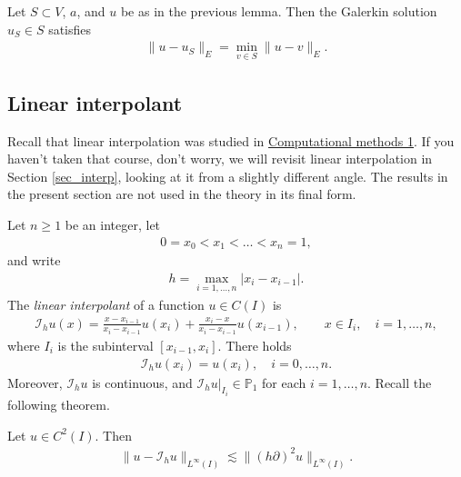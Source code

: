 \documentclass[12pt,oneside]{amsart}
\def\I{\mathcal I}
\begin{document}
\begin{corollary}\label{cor_abs_err}
Let $S \subset V$, $a$, and $u$ be as in the previous lemma. 
Then the Galerkin solution $u_S \in S$ satisfies
    \begin{align*}
\|u-u_S\|_E = \min_{v \in S} \|u - v\|_E.
    \end{align*}
\end{corollary}

\subsection{Linear interpolant}

Recall that linear interpolation was studied in \href{https://github.com/uh-comp-methods1/notebooks/blob/main/interpolation/lecture.ipynb}{Computational methods 1}. If you haven't taken that course, don't worry, we will revisit linear interpolation in Section \ref{sec_interp}, looking at it from a slightly different angle. The results in the present section are not used in the theory in its final form. 

Let $n \ge 1$ be an integer, let 
    \begin{align}\label{def_mesh}
0 = x_0 < x_1 < \dots < x_n = 1,
    \end{align}
and write
    \begin{align}\label{def_mesh_size}
h = \max_{i=1,\dots,n} |x_i - x_{i-1}|.
    \end{align}
The {\em linear interpolant} of a function $u \in C(I)$ is 
    \begin{align*}
\I_h u(x) = \frac{x - x_{i-1}}{x_i - x_{i-1}} u(x_i) + \frac{x_{i} - x}{x_i - x_{i-1}} u(x_{i-1}), \qquad x \in I_i, \quad i = 1,\dots,n,
    \end{align*}
where $I_i$ is the subinterval $[x_{i-1}, x_i]$.
There holds 
    \begin{align*}
\I_h u(x_i) = u(x_i), \quad i=0,\dots,n.
    \end{align*}
Moreover, $\I_h u$ is continuous, and $\I_h u|_{I_i} \in \mathbb P_1$ for each $i=1,\dots,n$. 
Recall the following theorem.

\begin{theorem}
Let $u \in C^2(I)$. Then 
    \begin{align*}
\|u - \I_h u\|_{L^\infty(I)} \lesssim \|(h \partial)^2 u\|_{L^\infty(I)}.
    \end{align*}
\end{theorem}
\end{document}
